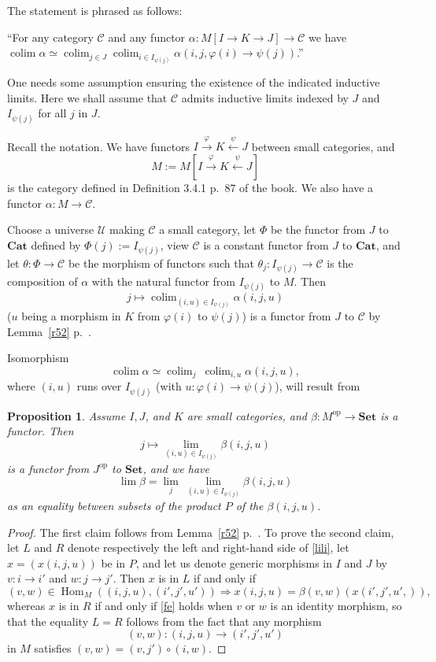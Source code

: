 \documentclass[12pt]{article}
\newtheorem{prop}[thm]{Proposition}
\theoremstyle{remark}
\theoremstyle{definition}
\newcommand{\C}{\mathcal C}
\newcommand{\U}{\mathcal U}
\newcommand{\Cat}{\mathbf{Cat}}
\newcommand{\Set}{\mathbf{Set}}
\newcommand{\pp}{\varphi}
\newcommand{\then}{\Rightarrow}
\DeclareMathOperator*{\colim}{colim}
\DeclareMathOperator{\Hom}{Hom}
\DeclareMathOperator{\op}{op}
\begin{document}
The statement is phrased as follows: 

``For any category $\C$ and any functor $\alpha:M[I\to K\rightarrow J]\to\C$ we have $\colim\alpha\simeq\colim_{j\in J}\colim_{i\in I_{\psi(j)}}\alpha(i,j,\pp(i)\to\psi(j))$.'' 

One needs some assumption ensuring the existence of the indicated inductive limits. Here we shall assume that $\C$ admits inductive limits indexed by $J$ and $I_{\psi(j)}$ for all $j$ in $J$. 

Recall the notation. We have functors $I\xrightarrow\pp K\xleftarrow\psi J$ between small categories, and 
$$
M:=M[I\xrightarrow\pp K\xleftarrow\psi J] 
$$ 
is the category defined in Definition 3.4.1 p.~87 of the book. We also have a functor $\alpha:M\to\C$. 

Choose a universe $\U$ making $\C$ a small category, let $\Phi$ be the functor from $J$ to $\Cat$ defined by $\Phi(j):=I_{\psi(j)}$, view $\C$ is a constant functor from $J$ to $\Cat$, and let $\theta:\Phi\to\C$ be the morphism of functors such that $\theta_j:I_{\psi(j)}\to\C$ is the composition of $\alpha$ with the natural functor from $I_{\psi(j)}$ to $M$. Then 
$$
j\mapsto\colim_{(i,u)\in I_{\psi(j)}}\alpha(i,j,u) 
$$ 
($u$ being a morphism in $K$ from $\pp(i)$ to $\psi(j)$) is a functor from $J$ to $\C$ by Lemma~\ref{r52} p.~\pageref{r52}. 

Isomorphism 
%
\begin{equation}\label{coco2}
\colim\alpha\simeq\colim_j\ \colim_{i,u}\alpha(i,j,u),
\end{equation} 
%
where $(i,u)$ runs over $I_{\psi(j)}$ (with $u:\pp(i)\to\psi(j)$), will result from 

\begin{prop}
Assume $I,J$, and $K$ are small categories, and $\beta:M^{\op}\to\Set$ is a functor. Then 
$$
j\mapsto\lim_{(i,u)\in I_{\psi(j)}}\beta(i,j,u)
$$ 
is a functor from $J^{\op}$ to $\Set$, and we have
%
\begin{equation}\label{lili} 
\lim\beta=\lim_j\ \lim_{(i,u)\in I_{\psi(j)}}\beta(i,j,u) 
\end{equation} 
%
as an equality between subsets of the product $P$ of the $\beta(i,j,u)$. 
\end{prop} 

\begin{proof}
The first claim follows from Lemma~\ref{r52} p.~\pageref{r52}. To prove the second claim, let $L$ and $R$ denote respectively the left and right-hand side of \eqref{lili}, let $x=(x(i,j,u))$ be in $P$, and let us denote generic morphisms in $I$ and $J$ by $v:i\to i'$ and $w:j\to j'$. Then $x$ is in $L$ if and only if 
%
\begin{equation}\label{fe} 
(v,w)\in\Hom_M((i,j,u),(i',j',u'))\then x(i,j,u)=\beta(v,w)(x(i',j',u',)), 
\end{equation} 
%
whereas $x$ is in $R$ if and only if \eqref{fe} holds when $v$ or $w$ is an identity morphism, so that the equality $L=R$ follows from the fact that any morphism 
$$
(v,w):(i,j,u)\to(i',j',u')
$$ 
in $M$ satisfies $(v,w)=(v,j')\circ(i,w)$.
\end{proof}
\end{document}
